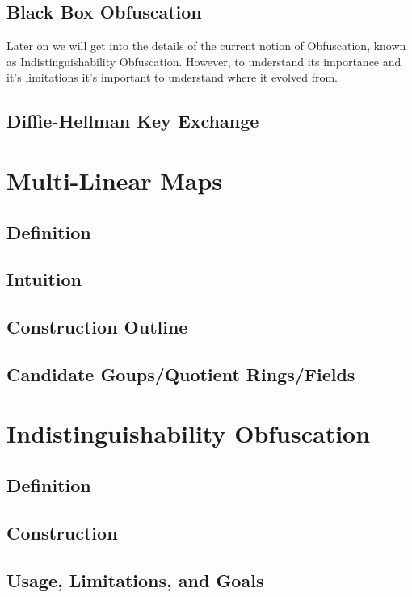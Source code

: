 \documentclass[12pt,twoside]{reedthesis}
\begin{document}
    \section{Black Box Obfuscation}
    Later on we will get into the details of the current notion of Obfuscation, known as Indistinguishability
    Obfuscation. However, to understand its importance and it's limitations it's important to understand
    where it evolved from. 
    \section{Diffie-Hellman Key Exchange}
    
    \chapter{Multi-Linear Maps}
    \section{Definition}
    \section{Intuition}
    \section{Construction Outline}
    \section{Candidate Goups/Quotient Rings/Fields}
    
    
    
    \chapter{Indistinguishability Obfuscation}
    \section{Definition}
    \section{Construction}
    \section{Usage, Limitations, and Goals}
    
    
    
\end{document}
